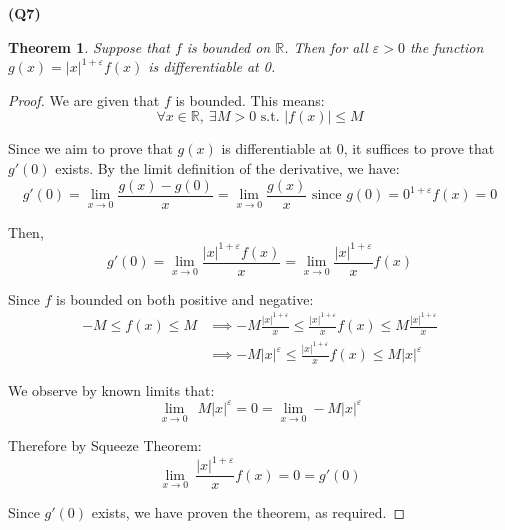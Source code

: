 \documentclass[12pt, a4paper]{article}
\renewcommand{\epsilon}{\varepsilon}
\newcommand{\displim}[1]{\displaystyle{\lim_{#1}}}
\newcommand{\zerolim}{\displim{x \to 0}}
\newcommand{\st}{\text{ s.t. }}
\newcommand{\R}{\mathbb{R}}
\newtheorem{theorem}{Theorem}
\begin{document}
\textbf{(Q7)}

\begin{theorem}
    Suppose that $f$ is bounded on $\R$. Then for all $\epsilon > 0$ the function
    $g(x) = |x|^{1 + \epsilon}f(x)$ is differentiable at 0.
\end{theorem}

\begin{proof}
    We are given that $f$ is bounded. This means:
    \[
        \forall x \in \R, \: \exists M > 0 \st |f(x)| \leq M
    \]

    Since we aim to prove that $g(x)$ is differentiable at 0, it suffices to prove that
    $g'(0)$ exists. By the limit definition of the derivative, we have:
    \[
        g'(0) = \zerolim \frac{g(x) - g(0)}{x} = \zerolim \frac{g(x)}{x} 
        \text{ since } g(0) = 0^{1 + \epsilon} f(x) = 0
    \]

    Then,
    \[
        g'(0) = \zerolim \frac{|x|^{1 + \epsilon} f(x)}{x} = 
        \zerolim \frac{|x|^{1 + \epsilon}}{x} f(x)
    \]

    Since $f$ is bounded on both positive and negative:
    \begin{align*}
        -M \leq f(x) \leq M & \implies 
        -M\frac{|x|^{1 + \epsilon}}{x} \leq \frac{|x|^{1 + \epsilon}}{x} f(x) \leq
        M\frac{|x|^{1 + \epsilon}}{x}\\
        & \implies -M|x|^{\epsilon} \leq \frac{|x|^{1 + \epsilon}}{x} f(x) \leq
        M|x|^{\epsilon}
    \end{align*}

    We observe by known limits that:
    \[
        \zerolim \:\: M|x|^{\epsilon} = 0 = \zerolim -M|x|^{\epsilon}
    \]

    Therefore by Squeeze Theorem:
    \[
        \zerolim \: \frac{|x|^{1 + \epsilon}}{x}f(x) = 0 = g'(0)
    \]

    Since $g'(0)$ exists, we have proven the theorem, as required.
\end{proof}
\end{document}
